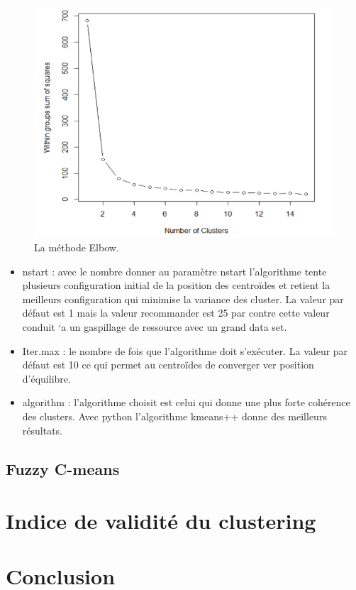 \begin{figure}[H]
	\begin{center}
		\includegraphics[width=\textwidth]{images/chapitre6/elbow_methods.png}
	\end{center}
	\caption{La méthode Elbow.}
	\label{elbow_methods}
\end{figure}

\begin{itemize}
	\item	nstart : avec le nombre donner au paramètre nstart l’algorithme tente plusieurs configuration initial de la position des centroïdes et retient la meilleurs configuration qui minimise la variance des cluster. La valeur par défaut est 1 mais la valeur recommander est 25 par contre cette valeur conduit `a un gaspillage de ressource avec un grand data set.
	\item	Iter.max : le nombre de fois que l’algorithme doit s’exécuter. La valeur par défaut est 10 ce qui permet au centroïdes de converger ver position d’équilibre.
	\item	algorithm : l’algorithme choisit est celui qui donne une plus forte cohérence des clusters. Avec python l’algorithme kmeans++ donne des meilleurs résultats.

\end{itemize}

\subsection{Fuzzy C-means}

\section{Indice de validité du clustering}

\section{Conclusion}

